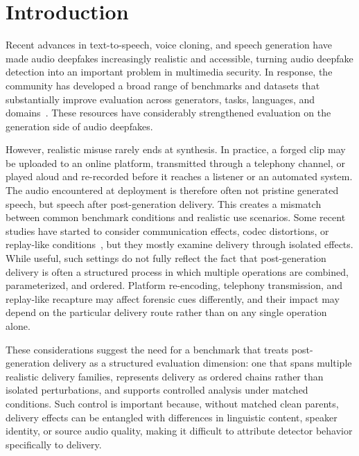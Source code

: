 \section{Introduction}
\label{sec:introduction}

Recent advances in text-to-speech, voice cloning, and speech generation have made audio deepfakes increasingly realistic and accessible, turning audio deepfake detection into an important problem in multimedia security. In response, the community has developed a broad range of benchmarks and datasets that substantially improve evaluation across generators, tasks, languages, and domains~\cite{liu2023asvspoof,yi2024add,frank2021wavefake,khalid2021fakeavceleb,muller2022generalize,zhang202partial,sun2023ai,muller2024mlaad,ma2024cfad,wang2026asvspoof,xie2025codecfake,bhagtani2025diffssd,ciobanu2026xmad,wang2025audeter}. These resources have considerably strengthened evaluation on the generation side of audio deepfakes.

However, realistic misuse rarely ends at synthesis. In practice, a forged clip may be uploaded to an online platform, transmitted through a telephony channel, or played aloud and re-recorded before it reaches a listener or an automated system. The audio encountered at deployment is therefore often not pristine generated speech, but speech after post-generation delivery. This creates a mismatch between common benchmark conditions and realistic use scenarios. Some recent studies have started to consider communication effects, codec distortions, or replay-like conditions~\cite{shi2025benchmarking,muller2025replay,delgado2026presentation}, but they mostly examine delivery through isolated effects. While useful, such settings do not fully reflect the fact that post-generation delivery is often a structured process in which multiple operations are combined, parameterized, and ordered. Platform re-encoding, telephony transmission, and replay-like recapture may affect forensic cues differently, and their impact may depend on the particular delivery route rather than on any single operation alone.

These considerations suggest the need for a benchmark that treats post-generation delivery as a structured evaluation dimension: one that spans multiple realistic delivery families, represents delivery as ordered chains rather than isolated perturbations, and supports controlled analysis under matched conditions. Such control is important because, without matched clean parents, delivery effects can be entangled with differences in linguistic content, speaker identity, or source audio quality, making it difficult to attribute detector behavior specifically to delivery.

